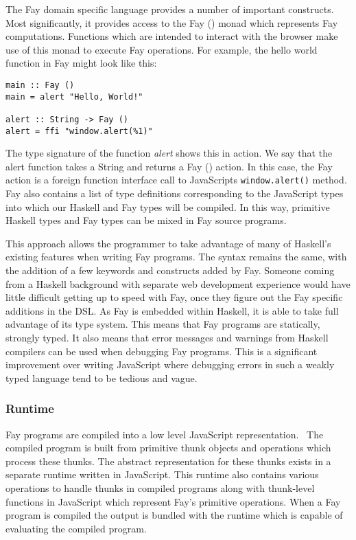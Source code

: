 The Fay domain specific language provides a number of important 
constructs. Most significantly, it provides access to the Fay () monad
which represents Fay computations. Functions which are intended to interact
with the browser make use of this monad to execute Fay operations. For
example, the hello world function in Fay might look like this:

\begin{verbatim}
main :: Fay ()
main = alert "Hello, World!"

alert :: String -> Fay ()
alert = ffi "window.alert(%1)"
\end{verbatim}

The type signature of the function \emph{alert} shows this in action.
We say that the alert function takes a String and returns a Fay () action.
In this case, the Fay action is a foreign function interface call to
JavaScripts \verb!window.alert()! method.  Fay also contains a list of type 
definitions corresponding to the JavaScript types into which our Haskell
and Fay types will be compiled. In this way, primitive Haskell types and 
Fay types can be mixed in Fay source programs. 

This approach allows the programmer to take advantage of many of Haskell's
existing features when writing Fay programs. The syntax remains the same,
with the addition of a few keywords and constructs added by Fay. Someone
coming from a Haskell background with separate web development experience
would have little difficult getting up to speed with Fay, once they figure
out the Fay specific additions in the DSL. As Fay is embedded within Haskell,
it is able to take full advantage of its type system. This means that Fay
programs are statically, strongly typed. It also means that error messages and warnings from 
Haskell compilers can be used when debugging Fay programs. This is a significant
improvement over writing JavaScript where debugging errors in such a weakly
typed language tend to be tedious and vague. 

\subsubsection{Runtime}
Fay programs are compiled into a low level JavaScript representation.~\cite{Fay}
 The
compiled program is built from primitive thunk objects and operations
which process these thunks. The abstract representation for these thunks 
exists in a separate runtime written in JavaScript. This runtime also contains
various operations to handle thunks in compiled programs along with thunk-level 
functions in JavaScript which represent Fay's primitive operations. When a
Fay program is compiled the output is bundled with the runtime which is 
capable of evaluating the compiled program. 

